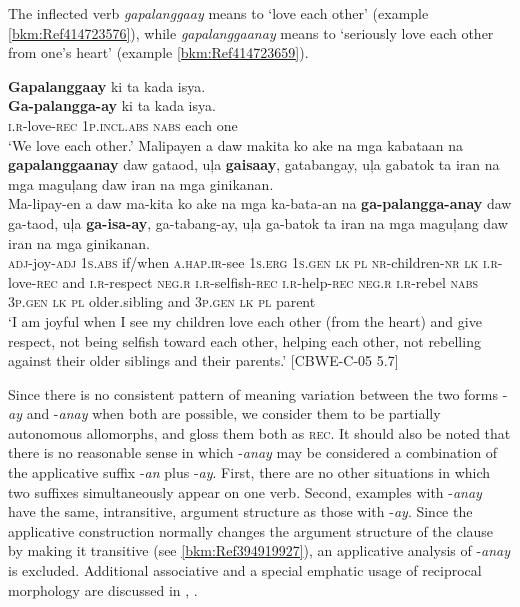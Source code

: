 \hspace*{-.6pt}The inflected verb \textit{gapalanggaay} means to ‘love each other’ (example \ref{bkm:Ref414723576}), while \textit{gapalanggaanay} means to ‘seriously love each other from one’s heart’ (example \ref{bkm:Ref414723659}).

\ea
\label{bkm:Ref414723576} \label{bkm:Ref414723659}
\textbf{Gapalanggaay}  ki  ta  kada  isya. \\\smallskip
\gll \textbf{Ga-palangga-ay}  ki  ta  kada  isya. \\
\textsc{i.r}-love-\textsc{rec}  1\textsc{p.incl.abs}  \textsc{nabs}  each  one \\
\glt ‘We love each other.’
\z
\ea
Malipayen  a  daw  makita  ko  ake  na  mga kabataan  na  \textbf{gapalanggaanay}  daw  gataod,  uļa  \textbf{gaisaay}, gatabangay,  uļa  gabatok  ta  iran  na  mga  maguļang daw  iran  na  mga  ginikanan. \\\smallskip
\gll Ma-lipay-en  a  daw  ma-kita  ko  ake  na  mga ka-bata-an  na  \textbf{ga-palangga-anay}  daw  ga-taod,  uļa  \textbf{ga-isa-ay}, ga-tabang-ay,  uļa  ga-batok  ta  iran  na  mga  maguļang daw  iran  na  mga  ginikanan. \\
\textsc{adj}-joy-\textsc{adj} 1\textsc{s.abs}  if/when  \textsc{a.hap.ir}-see  1\textsc{s.erg} 1\textsc{s.gen}  \textsc{lk}  \textsc{pl}
\textsc{nr}-children-\textsc{nr}  \textsc{lk}  \textsc{i.r}-love-\textsc{rec}  and  \textsc{i.r}-respect  \textsc{neg.r}  \textsc{i.r}-selfish-\textsc{rec} \textsc{i.r}-help-\textsc{rec}  \textsc{neg.r}  \textsc{i.r}-rebel  \textsc{nabs}  3\textsc{p.gen}  \textsc{lk}  \textsc{pl}  older.sibling and  3\textsc{p.gen}  \textsc{lk}  \textsc{pl} parent \\
\glt `I am joyful when I see my children love each other (from the heart) and give respect, not being selfish toward each other, helping each other, not rebelling against their older siblings and their parents.’ [CBWE-C-05 5.7]
\z

Since there is no consistent pattern of meaning variation between the two forms \nobreakdash-\textit{ay} and \nobreakdash-\textit{anay} when both are possible, we consider them to be partially autonomous allomorphs, and gloss them both as \textsc{rec}. It should also be noted that there is no reasonable sense in which -\textit{anay} may be considered a combination of the applicative suffix -\textit{an} plus -\textit{ay}.  First, there are no other situations in which two suffixes simultaneously appear on one verb. Second, examples with -\textit{anay} have the same, intransitive, argument structure as those with -\textit{ay}. Since the applicative construction normally changes the argument structure of the clause by making it transitive (see \ref{bkm:Ref394919927}), an applicative analysis of -\textit{anay} is excluded. Additional associative and a special emphatic usage of reciprocal morphology are discussed in , .

